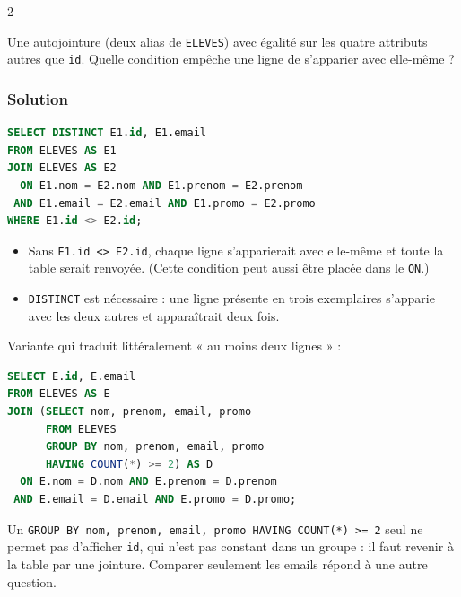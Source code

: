 \documentclass[11pt,a4paper]{article}
\providecommand{\tightlist}{\setlength{\itemsep}{0pt}\setlength{\parskip}{0pt}}
\begin{document}
\begin{indication}{2}

Une autojointure (deux alias de \texttt{ELEVES}) avec égalité sur les quatre attributs autres que \texttt{id}. Quelle condition empêche une ligne de s'apparier avec elle-même ?

\end{indication}

\hypertarget{solution-2}{%
\subsubsection{Solution}\label{solution-2}}

\begin{lstlisting}[language=SQL]
SELECT DISTINCT E1.id, E1.email
FROM ELEVES AS E1
JOIN ELEVES AS E2
  ON E1.nom = E2.nom AND E1.prenom = E2.prenom
 AND E1.email = E2.email AND E1.promo = E2.promo
WHERE E1.id <> E2.id;
\end{lstlisting}

\begin{itemize}
\tightlist
\item
  Sans \texttt{E1.id\ \textless{}\textgreater{}\ E2.id}, chaque ligne s'apparierait avec elle-même et toute la table serait renvoyée. (Cette condition peut aussi être placée dans le \texttt{ON}.)
\item
  \texttt{DISTINCT} est nécessaire : une ligne présente en trois exemplaires s'apparie avec les deux autres et apparaîtrait deux fois.
\end{itemize}

Variante qui traduit littéralement « au moins deux lignes » :

\begin{lstlisting}[language=SQL]
SELECT E.id, E.email
FROM ELEVES AS E
JOIN (SELECT nom, prenom, email, promo
      FROM ELEVES
      GROUP BY nom, prenom, email, promo
      HAVING COUNT(*) >= 2) AS D
  ON E.nom = D.nom AND E.prenom = D.prenom
 AND E.email = D.email AND E.promo = D.promo;
\end{lstlisting}

\begin{piege}

Un \texttt{GROUP\ BY\ nom,\allowbreak{}\ prenom,\allowbreak{}\ email,\allowbreak{}\ promo\ HAVING\ COUNT(\allowbreak{}*)\allowbreak{}\ \textgreater{}=\allowbreak{}\ 2} seul ne permet pas d'afficher \texttt{id}, qui n'est pas constant dans un groupe : il faut revenir à la table par une jointure. Comparer seulement les emails répond à une autre question.

\end{piege}
\end{document}
